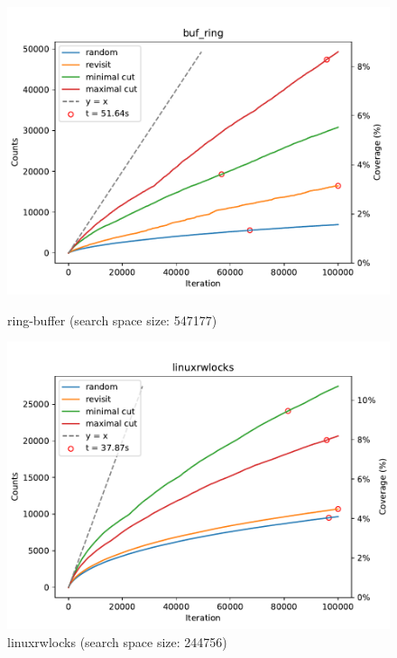 \begin{figure}[h!]

	\centering
	\begin{minipage}{0.45\textwidth}
		\centering
		\includegraphics[width=\textwidth]{figure/genmc/buf_ring.pdf}
		\caption{ring-buffer (search space size: 547177)}
		\label{genmc:buf_ring}
	\end{minipage}
	\hfill
	\begin{minipage}{0.45\textwidth}
		\centering
		\includegraphics[width=\textwidth]{figure/genmc/linuxrwlocks.pdf}
		\caption{linuxrwlocks (search space size: 244756)}
		\label{genmc:linuxrwlocks}
	\end{minipage}


\end{figure}
